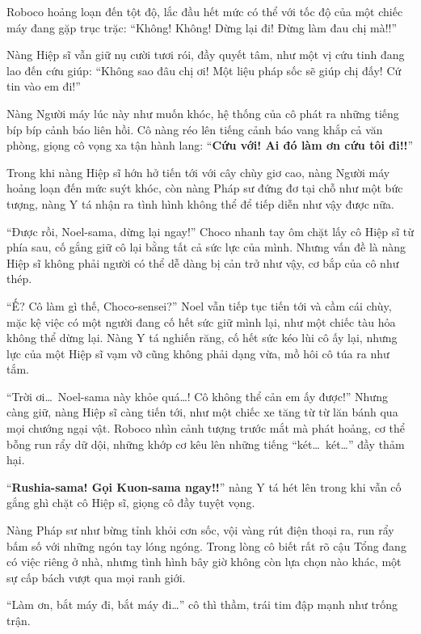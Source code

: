 \documentclass[../main.tex]{subfiles}
\begin{document}
Roboco hoảng loạn đến tột độ, lắc đầu hết mức có thể với tốc độ của một chiếc máy đang gặp trục trặc: ``Không! Không! Dừng lại đi! Đừng làm đau chị mà!!''

Nàng Hiệp sĩ vẫn giữ nụ cười tươi rói, đầy quyết tâm, như một vị cứu tinh đang lao đến cứu giúp: ``Không sao đâu chị ơi! Một liệu pháp sốc sẽ giúp chị đấy! Cứ tin vào em đi!''


Nàng Người máy lúc này như muốn khóc, hệ thống của cô phát ra những tiếng bíp bíp cảnh báo liên hồi. Cô nàng réo lên tiếng cảnh báo vang khắp cả văn phòng, giọng cô vọng xa tận hành lang: ``\textbf{Cứu với! Ai đó làm ơn cứu tôi đi!!}''

Trong khi nàng Hiệp sĩ hớn hở tiến tới với cây chùy giơ cao, nàng Người máy hoảng loạn đến mức suýt khóc, còn nàng Pháp sư đứng đơ tại chỗ như một bức tượng, nàng Y tá nhận ra tình hình không thể để tiếp diễn như vậy được nữa.

``Được rồi, Noel-sama, dừng lại ngay!'' Choco nhanh tay ôm chặt lấy cô Hiệp sĩ từ phía sau, cố gắng giữ cô lại bằng tất cả sức lực của mình. Nhưng vấn đề là nàng Hiệp sĩ không phải người có thể dễ dàng bị cản trở như vậy, cơ bắp của cô như thép.

``Ế? Cô làm gì thế, Choco-sensei?'' Noel  vẫn tiếp tục tiến tới và cầm cái chùy, mặc kệ việc có một người đang cố hết sức giữ mình lại, như một chiếc tàu hỏa không thể dừng lại. Nàng Y tá nghiến răng, cố hết sức kéo lùi cô ấy lại, nhưng lực của một Hiệp sĩ vạm vỡ cũng không phải dạng vừa, mồ hôi cô túa ra như tắm.

``Trời ơi\dots\ Noel-sama này khỏe quá\dots! Cô không thể cản em ấy được!'' Nhưng càng giữ, nàng Hiệp sĩ càng tiến tới, như một chiếc xe tăng từ từ lăn bánh qua mọi chướng ngại vật. Roboco nhìn cảnh tượng trước mắt mà phát hoảng, cơ thể bỗng run rẩy dữ dội, những khớp cơ kêu lên những tiếng ``két\dots\ két\dots'' đầy thảm hại.

``\textbf{Rushia-sama! Gọi Kuon-sama ngay!!}'' nàng Y tá hét lên trong khi vẫn cố gắng ghì chặt cô Hiệp sĩ, giọng cô đầy tuyệt vọng.

Nàng Pháp sư như bừng tỉnh khỏi cơn sốc, vội vàng rút điện thoại ra, run rẩy bấm số với những ngón tay lóng ngóng. Trong lòng cô biết rất rõ cậu Tổng đang có việc riêng ở nhà, nhưng tình hình bây giờ không còn lựa chọn nào khác, một sự cấp bách vượt qua mọi ranh giới.

``Làm ơn, bắt máy đi, bắt máy đi\dots'' cô thì thầm, trái tim đập mạnh như trống trận.
\end{document}

